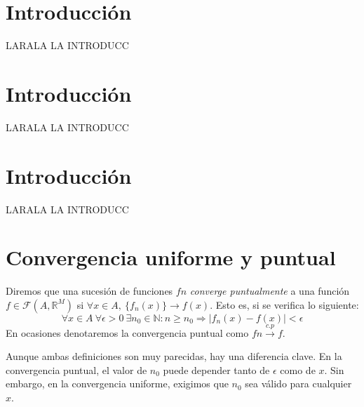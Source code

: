 
\section*{Introducción}

LARALA LA INTRODUCC

\newpage

\section{Introducción}

LARALA LA INTRODUCC

\section*{Introducción}

LARALA LA INTRODUCC

\newpage


\section{Convergencia uniforme y puntual}

\begin{ndef} Diremos que una sucesión de funciones $fn$ \textit{converge puntualmente} a una función $f\in \mathcal{F}(A,\mathbb{R}^M)$ si $\forall x \in A, \ \{f_n(x)\} \rightarrow f(x)$. Esto es, si se verifica lo siguiente:
  \[
    \forall x\in A\ \forall \epsilon > 0\ \exists n_0 \in \mathbb{N}: n \ge n_0 \Rightarrow |f_n(x)-f(x)| < \epsilon
  \]
  En ocasiones denotaremos la convergencia puntual como $fn \xrightarrow {c.p} f$.
\end{ndef}


\begin{nota}
  Aunque ambas definiciones son muy parecidas, hay una diferencia clave. En la convergencia puntual, el valor de $n_0$ puede depender tanto de $\epsilon$ como de $x$. Sin embargo, en la convergencia uniforme, exigimos que $n_0$ sea válido para cualquier $x$.
\end{nota}

